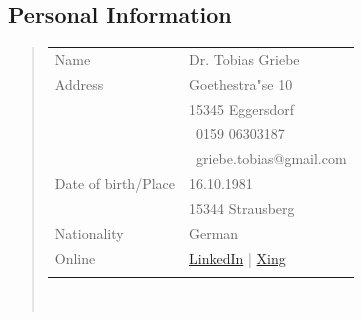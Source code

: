 \subsection*{Personal Information}
\begin{quote}
	\begin{tabular}{p{4cm}l}
		Name&Dr. Tobias Griebe\\
		Address&Goethestra"se 10\\
		&15345 Eggersdorf\\
		&\Mobilefone\ 0159 06303187\\	
		&\MVAt\ griebe.tobias@gmail.com\\
		Date of birth/Place&16.10.1981\\
		&15344 Strausberg\\
		Nationality&German\\
		Online&
		\href{https://www.linkedin.com/in/dr-tobias-griebe-7b654416b}{LinkedIn} | 
		\href{https://www.xing.com/profile/Tobias_Griebe3}{Xing}\\\\
	\end{tabular}\\
\end{quote}
